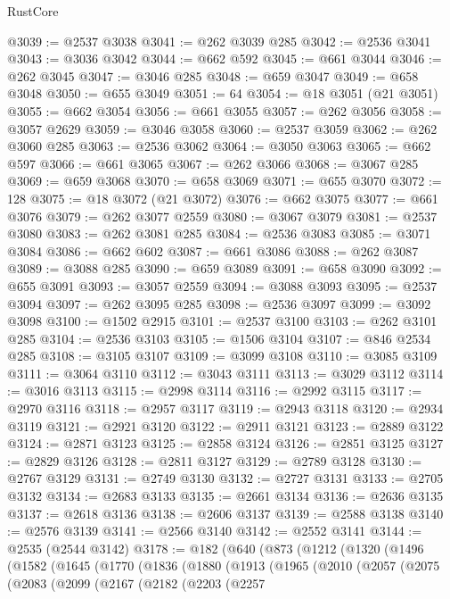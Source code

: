 \begin{lexlean}{RustCore}
\begin{coremodule}
@3039 := @2537 @3038
@3041 := @262 @3039 @285
@3042 := @2536 @3041
@3043 := @3036 @3042
@3044 := @662 @592
@3045 := @661 @3044
@3046 := @262 @3045
@3047 := @3046 @285
@3048 := @659 @3047
@3049 := @658 @3048
@3050 := @655 @3049
@3051 := 64
@3054 := @18 @3051 (@21 @3051)
@3055 := @662 @3054
@3056 := @661 @3055
@3057 := @262 @3056
@3058 := @3057 @2629
@3059 := @3046 @3058
@3060 := @2537 @3059
@3062 := @262 @3060 @285
@3063 := @2536 @3062
@3064 := @3050 @3063
@3065 := @662 @597
@3066 := @661 @3065
@3067 := @262 @3066
@3068 := @3067 @285
@3069 := @659 @3068
@3070 := @658 @3069
@3071 := @655 @3070
@3072 := 128
@3075 := @18 @3072 (@21 @3072)
@3076 := @662 @3075
@3077 := @661 @3076
@3079 := @262 @3077 @2559
@3080 := @3067 @3079
@3081 := @2537 @3080
@3083 := @262 @3081 @285
@3084 := @2536 @3083
@3085 := @3071 @3084
@3086 := @662 @602
@3087 := @661 @3086
@3088 := @262 @3087
@3089 := @3088 @285
@3090 := @659 @3089
@3091 := @658 @3090
@3092 := @655 @3091
@3093 := @3057 @2559
@3094 := @3088 @3093
@3095 := @2537 @3094
@3097 := @262 @3095 @285
@3098 := @2536 @3097
@3099 := @3092 @3098
@3100 := @1502 @2915
@3101 := @2537 @3100
@3103 := @262 @3101 @285
@3104 := @2536 @3103
@3105 := @1506 @3104
@3107 := @846 @2534 @285
@3108 := @3105 @3107
@3109 := @3099 @3108
@3110 := @3085 @3109
@3111 := @3064 @3110
@3112 := @3043 @3111
@3113 := @3029 @3112
@3114 := @3016 @3113
@3115 := @2998 @3114
@3116 := @2992 @3115
@3117 := @2970 @3116
@3118 := @2957 @3117
@3119 := @2943 @3118
@3120 := @2934 @3119
@3121 := @2921 @3120
@3122 := @2911 @3121
@3123 := @2889 @3122
@3124 := @2871 @3123
@3125 := @2858 @3124
@3126 := @2851 @3125
@3127 := @2829 @3126
@3128 := @2811 @3127
@3129 := @2789 @3128
@3130 := @2767 @3129
@3131 := @2749 @3130
@3132 := @2727 @3131
@3133 := @2705 @3132
@3134 := @2683 @3133
@3135 := @2661 @3134
@3136 := @2636 @3135
@3137 := @2618 @3136
@3138 := @2606 @3137
@3139 := @2588 @3138
@3140 := @2576 @3139
@3141 := @2566 @3140
@3142 := @2552 @3141
@3144 := @2535 (@2544 @3142)
@3178 := @182
    (@640
      (@873
        (@1212
          (@1320
            (@1496
              (@1582
                (@1645
                  (@1770
                    (@1836
                      (@1880
                        (@1913
                          (@1965
                            (@2010
                              (@2057
                                (@2075
                                  (@2083
                                    (@2099
                                      (@2167
                                        (@2182
                                          (@2203
                                            (@2257

\end{coremodule}
\end{lexlean}
